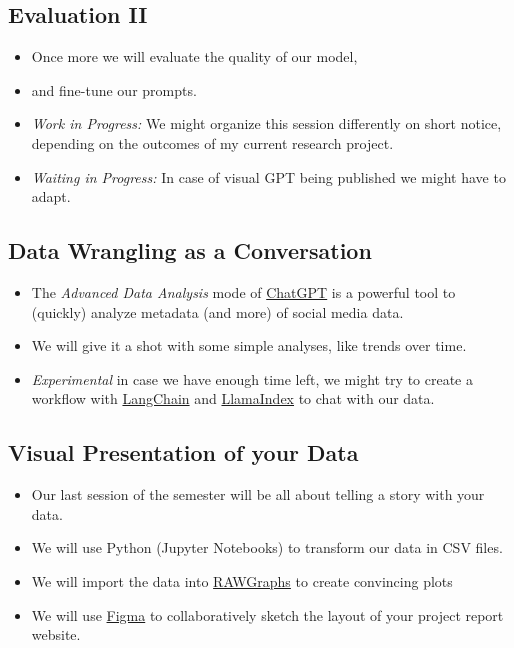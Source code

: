 \documentclass[
  letterpaper,
  DIV=11,
  numbers=noendperiod]{scrartcl}
\providecommand{\tightlist}{%
  \setlength{\itemsep}{0pt}\setlength{\parskip}{0pt}}\usepackage{longtable,booktabs,array}
\begin{document}
\hypertarget{evaluation-ii}{%
\subsection{Evaluation II}\label{evaluation-ii}}

\begin{itemize}
\tightlist
\item
  Once more we will evaluate the quality of our model,
\item
  and fine-tune our prompts.
\item
  \emph{Work in Progress:} We might organize this session differently on
  short notice, depending on the outcomes of my current research
  project.
\item
  \emph{Waiting in Progress:} In case of visual GPT being published we
  might have to adapt.
\end{itemize}

\hypertarget{data-wrangling-as-a-conversation}{%
\subsection{Data Wrangling as a
Conversation}\label{data-wrangling-as-a-conversation}}

\begin{itemize}
\tightlist
\item
  The \emph{Advanced Data Analysis} mode of
  \href{https://chat.openai.com/}{ChatGPT} is a powerful tool to
  (quickly) analyze metadata (and more) of social media data.
\item
  We will give it a shot with some simple analyses, like trends over
  time.
\item
  \emph{Experimental} in case we have enough time left, we might try to
  create a workflow with \href{https://www.langchain.com/}{LangChain}
  and \href{https://www.llamaindex.ai/}{LlamaIndex} to chat with our
  data.
\end{itemize}

\hypertarget{visual-presentation-of-your-data}{%
\subsection{Visual Presentation of your
Data}\label{visual-presentation-of-your-data}}

\begin{itemize}
\tightlist
\item
  Our last session of the semester will be all about telling a story
  with your data.
\item
  We will use Python (Jupyter Notebooks) to transform our data in CSV
  files.
\item
  We will import the data into
  \href{https://www.rawgraphs.io/}{RAWGraphs} to create convincing plots
\item
  We will use \href{https://www.figma.com/}{Figma} to collaboratively
  sketch the layout of your project report website.
\end{itemize}
\end{document}
